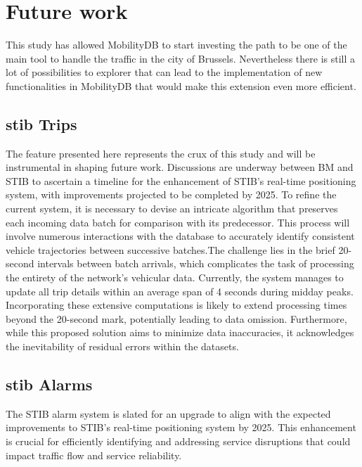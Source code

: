 \documentclass[12pt]{report}
\begin{document}
	\chapter{Future work}
	
	This study has allowed MobilityDB to start investing the path to be one of the main tool to handle the traffic in the city of Brussels. Nevertheless there is still a lot of possibilities to explorer that can lead to the implementation of new functionalities in MobilityDB that would make this extension even more efficient.
	
	\section{\acrshort{stib} Trips}
	
	The feature presented here represents the crux of this study and will be instrumental in shaping future work. Discussions are underway between BM and STIB to ascertain a timeline for the enhancement of STIB's real-time positioning system, with improvements projected to be completed by 2025. To refine the current system, it is necessary to devise an intricate algorithm that preserves each incoming data batch for comparison with its predecessor. This process will involve numerous interactions with the database to accurately identify consistent vehicle trajectories between successive batches.The challenge lies in the brief 20-second intervals between batch arrivals, which complicates the task of processing the entirety of the network's vehicular data. Currently, the system manages to update all trip details within an average span of 4 seconds during midday peaks. Incorporating these extensive computations is likely to extend processing times beyond the 20-second mark, potentially leading to data omission. Furthermore, while this proposed solution aims to minimize data inaccuracies, it acknowledges the inevitability of residual errors within the datasets.
	

	\section{\acrshort{stib} Alarms}
	
	The STIB alarm system is slated for an upgrade to align with the expected improvements to STIB's real-time positioning system by 2025. This enhancement is crucial for efficiently identifying and addressing service disruptions that could impact traffic flow and service reliability.
	
\end{document}
